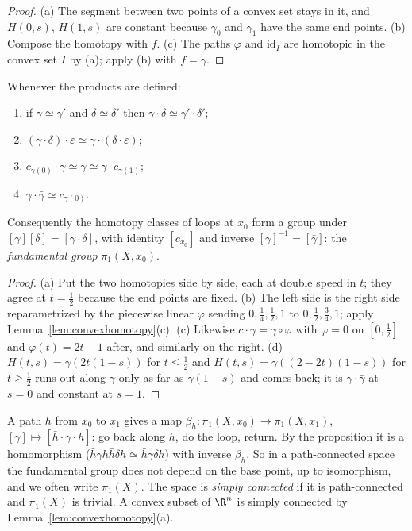 \begin{proof}
(a) The segment between two points of a convex set stays in it, and $H(0,s)$, $H(1,s)$ are constant because $\gamma_0$ and $\gamma_1$ have the same end points. (b) Compose the
homotopy with $f$. (c) The paths $\varphi$ and $\mathrm{id}_I$ are homotopic in the convex set $I$ by (a); apply (b) with $f=\gamma$.
\end{proof}

\begin{proposition}\label{prop:pi1group}
Whenever the products are defined:
\begin{enumerate}
\item[(a)] if $\gamma\simeq\gamma'$ and $\delta\simeq\delta'$ then $\gamma\cdot\delta\simeq\gamma'\cdot\delta'$;
\item[(b)] $(\gamma\cdot\delta)\cdot\varepsilon\simeq\gamma\cdot(\delta\cdot\varepsilon)$;
\item[(c)] $c_{\gamma(0)}\cdot\gamma\simeq\gamma\simeq\gamma\cdot c_{\gamma(1)}$;
\item[(d)] $\gamma\cdot\bar\gamma\simeq c_{\gamma(0)}$.
\end{enumerate}
Consequently the homotopy classes of loops at $x_0$ form a group under $[\gamma][\delta]=[\gamma\cdot\delta]$, with identity $[c_{x_0}]$ and inverse $[\gamma]^{-1}=[\bar\gamma]$: the
\emph{fundamental group} $\pi_1(X,x_0)$.
\end{proposition}

\begin{proof}
(a) Put the two homotopies side by side, each at double speed in $t$; they agree at $t=\frac12$ because the end points are fixed. (b) The left side is the right side
reparametrized by the piecewise linear $\varphi$ sending $0,\frac14,\frac12,1$ to $0,\frac12,\frac34,1$; apply Lemma~\ref{lem:convexhomotopy}(c). (c) Likewise $c\cdot\gamma=\gamma\circ\varphi$ with
$\varphi=0$ on $[0,\frac12]$ and $\varphi(t)=2t-1$ after, and similarly on the right. (d) $H(t,s)=\gamma(2t(1-s))$ for $t\le\frac12$ and $H(t,s)=\gamma((2-2t)(1-s))$ for $t\ge\frac12$
runs out along $\gamma$ only as far as $\gamma(1-s)$ and comes back; it is $\gamma\cdot\bar\gamma$ at $s=0$ and constant at $s=1$.
\end{proof}

A path $h$ from $x_0$ to $x_1$ gives a map $\beta_h\colon\pi_1(X,x_0)\to\pi_1(X,x_1)$, $[\gamma]\mapsto[\bar h\cdot\gamma\cdot h]$: go back along $h$, do the loop, return. By the proposition it is a
homomorphism ($\bar h\gamma h\bar h\delta h\simeq\bar h\gamma\delta h$) with inverse $\beta_{\bar h}$. So in a path-connected space the fundamental group does not depend on the base
point, up to isomorphism, and we often write $\pi_1(X)$. The space is \emph{simply connected} if it is path-connected and $\pi_1(X)$ is trivial. A convex subset of $\R^n$ is
simply connected by Lemma~\ref{lem:convexhomotopy}(a).

